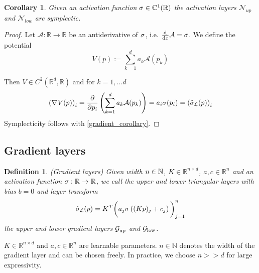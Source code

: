 \documentclass[twoside,a4paper]{article}
\newtheorem{definition}{Definition}
\newtheorem{corollary}{Corollary}
\begin{document}
\begin{corollary}
	Given an activation function $\sigma \in \mathbb{C}^1(\mathbb{R})$
	the activation layers $\mathcal{N}_{up}$ and $\mathcal{N}_{low}$ are symplectic.
\end{corollary}
\begin{proof}
	Let $\mathcal{A}: \mathbb{R} \to \mathbb{R}$ be an antiderivative of $\sigma$, 
	i.e. $\frac{\mathrm{d}^{}}{\mathrm{d}x} \mathcal{A} = \sigma$. We define the potential
	\begin{equation*}
		V(p) := \sum_{k=1}^d a_k \mathcal{A}(p_k)
	\end{equation*}

	Then $V \in C^2(\mathbb{R}^d, \mathbb{R})$ and for $k=1, \dots d$
	\begin{equation*}
		\left( \nabla_{}{V}(p) \right)_i = \frac{\partial }{\partial p_i} \left( \sum_{k=1}^d a_k \mathcal{A}(p_k) \right)
		= a_i \sigma(p_i) = \left( \hat{\sigma}_{\mathcal{L}}(p) \right)_i
	\end{equation*}
	Symplecticity follows with \cref{gradient_corollary}.
\end{proof}


\subsection{Gradient layers}

\begin{definition}
	(Gradient layers)
	Given width $n \in \mathbb{N}$, $K \in \mathbb{R}^{n \times d}$, $a,c \in \mathbb{R}^n$ and
	an activation function $\sigma : \mathbb{R} \to \mathbb{R}$,
	we call the upper and lower triangular layers with bias $b=0$ and layer transform
	\begin{equation*}
		\hat{\sigma}_{\mathcal{L}}(p) = K^T \bigg( a_j \sigma \left( (Kp)_j + c_j \right) \bigg)_{j=1}^n
	\end{equation*}
	the upper and lower gradient layers $\mathcal{G}_{\text{up}}$ and $\mathcal{G}_{\text{low}}$.
\end{definition}
$K \in \mathbb{R}^{n \times d}$ and $a,c \in \mathbb{R}^n$
are learnable parameters. 
$n \in \mathbb{N}$ denotes the width of the gradient layer and can be chosen freely.
In practice, we choose $n >> d$ for large expressivity.
\end{document}
